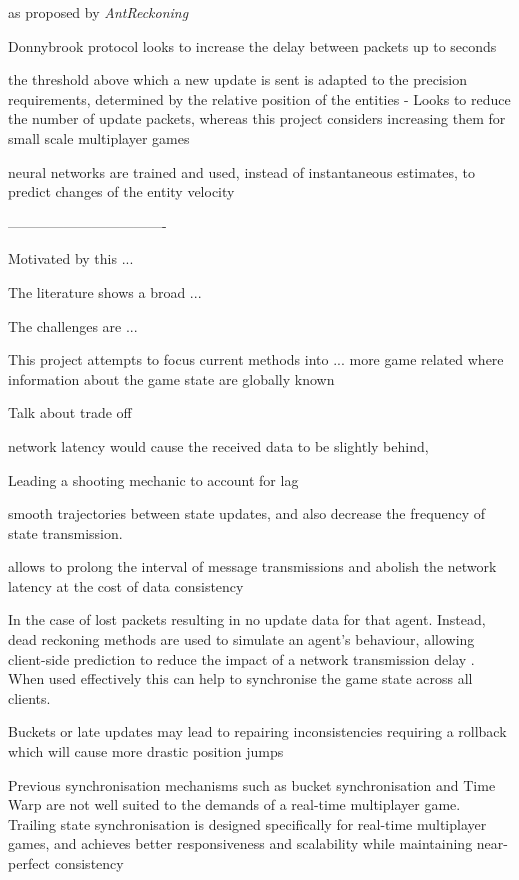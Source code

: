 \documentclass[journal]{IEEEtran}
\begin{document}
as proposed by \textit{AntReckoning} \cite{yahyavi2011antreckoning}

Donnybrook protocol looks to increase the delay between packets up to seconds

the threshold above which a new update is sent is adapted to the precision requirements, determined by the relative position of the entities \cite{cai1999auto} - Looks to reduce the number of update packets, whereas this project considers increasing them for small scale multiplayer games

neural networks are trained and used, instead of instantaneous estimates, to predict changes of the entity velocity \cite{mccoy2007multistep}

----------------------------------

Motivated by this ...


The literature shows a broad ...

The challenges are ...

This project attempts to focus current methods into ... more game related where information about the game state are globally known



Talk about trade off

network latency would cause the received data to be slightly behind,

Leading a shooting mechanic to account for lag \cite{bernier2001latency}

smooth trajectories between state updates, and also decrease the frequency of state transmission.

allows to prolong the interval of message transmissions and abolish the network latency at the cost of data consistency \cite{smed2002aspects}

In the case of lost packets resulting in no update data for that agent. Instead, dead reckoning methods are used to simulate an agent's behaviour, allowing client-side prediction to reduce the impact of a network transmission delay \cite{pantel2002suitability}. When used effectively this can help to synchronise the game state across all clients.




Buckets or late updates may lead to repairing inconsistencies requiring a rollback which will cause more drastic position jumps \cite{cronin2002efficient}

Previous synchronisation mechanisms such as bucket synchronisation and Time Warp are not well suited to the demands of a real-time multiplayer game. Trailing state synchronisation is designed specifically for real-time multiplayer games, and achieves better responsiveness and scalability while maintaining near-perfect consistency \cite{cronin2001distributed}
\end{document}
